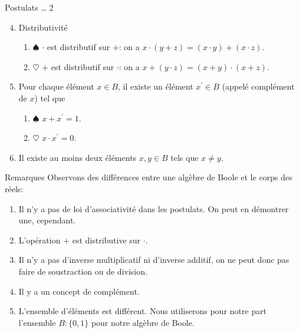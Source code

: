 \documentclass[presentation]{beamer}
\begin{document}
\begin{frame}[label={sec:org82b7811}]{Postulats \ldots{} 2}
\begin{enumerate}
\setcounter{enumi}{3}
\item Distributivité

\begin{enumerate}
\item \(\spadesuit\) \(\cdot\) est distributif sur \(+\): on a \(x \cdot (y + z)= (x \cdot y) +
        (x \cdot z)\).

\item \(\heartsuit\) \(+\) est distributif sur \(\cdot\): on a \(x + (y \cdot z)= (x + y) \cdot
        (x + z)\).
\end{enumerate}

\item Pour chaque élément \(x \in B\), il existe un élément
\(x^{\prime} \in B\) (appelé complément de \(x\)) tel que

\begin{enumerate}
\item \(\spadesuit\) \(x + x^{\prime} = 1\).

\item \(\heartsuit\) \(x \cdot x^{\prime} = 0\).
\end{enumerate}

\item Il existe au moins deux éléments \(x, y \in B\) tels que \(x \neq y\).
\end{enumerate}
\end{frame}

\begin{frame}[label={sec:orga4f4e9e}]{Remarques}
Observons des différences entre une algèbre de Boole et le corps des réels:

\begin{enumerate}
\item Il n'y a pas de loi d'associativité dans les postulats. On peut en démontrer une, cependant.

\item L'opération \(+\) est distributive sur \(\cdot\).

\item Il n'y a pas d'inverse multiplicatif ni d'inverse additif, on ne peut donc pas faire de soustraction ou de division.

\item Il y a un concept de complément.

\item L'ensemble d'éléments est différent. Nous utiliserons pour notre part l'ensemble \(B: \{0, 1 \}\) pour notre algèbre de Boole.
\end{enumerate}
\end{frame}
\end{document}
